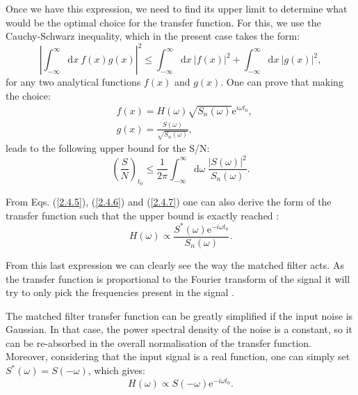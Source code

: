 Once we have this expression, we need to find its upper limit to determine what would be the optimal choice for the transfer function. For this, we use the Cauchy-Schwarz inequality, which in the present case takes the form:
\begin{equation}\label{2.4.6}
	\left|\int_{-\infty}^{\infty} \mathrm{d}x \ f(x) g(x)\right|^{2} \leq \int_{-\infty}^{\infty} \mathrm{d}x \ \left|f(x)\right|^{2} + \int_{-\infty}^{\infty} \mathrm{d}x \ \left|g(x)\right|^{2},
\end{equation}
for any two analytical functions $f(x)$ and $g(x)$. One can prove that making the choice:
\begin{equation}\label{2.4.7}
	\begin{split}
		&f(x) = H(\omega) \sqrt{S_{n}(\omega)}\mathrm{e}^{i \omega t_{0}},\\
		&g(x) = \frac{S(\omega)}{\sqrt{S_{n}(\omega)}},
	\end{split}
\end{equation}
leads to the following upper bound for the S/N:
\begin{equation}\label{2.4.8}
	\left(\frac{S}{N}\right)_{t_{0}} \leq \frac{1}{2\pi}\int_{-\infty}^{\infty} \mathrm{d}\omega \  \frac{\left|S(\omega)\right|^{2}}{S_{n}(\omega)}.
\end{equation}

From Eqs. (\ref{2.4.5}), (\ref{2.4.6}) and (\ref{2.4.7}) one can also derive the form of the transfer function such that the upper bound is exactly reached \cite{Dwork1950}:
\begin{equation}\label{2.4.9}
	H(\omega) \propto \frac{S^{*}(\omega) \mathrm{e}^{-i \omega t_{0}}}{S_{n}(\omega)}.
\end{equation}

From this last expression we can clearly see the way the matched filter acts. As the transfer function is proportional to the Fourier transform of the signal it will try to only pick the frequencies present in the signal \cite{Wainstein1962}.

The matched filter transfer function can be greatly simplified if the input noise is Gaussian. In that case, the power spectral density of the noise is a constant, so it can be re-absorbed in the overall normalisation of the transfer function. Moreover, considering that the input signal is a real function, one can simply set $S^{*}(\omega) = S(-\omega)$, which gives:
\begin{equation}\label{2.4.10}
	H(\omega) \propto S(-\omega) \mathrm{e}^{-i \omega t_{0}}.
\end{equation}


